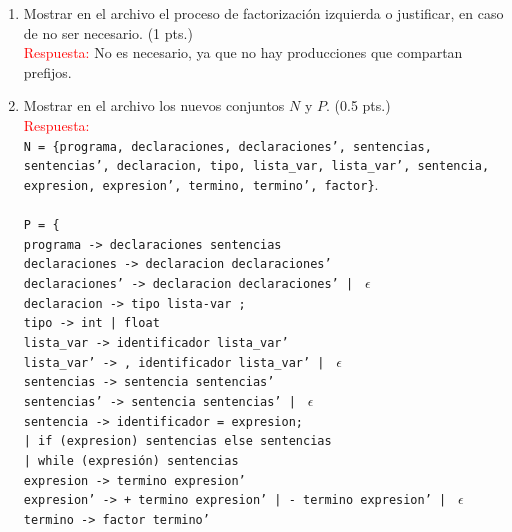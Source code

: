 \documentclass[11pt]{report}
\begin{document}
\begin{enumerate}
\begin{tabular}{ |p{13cm}|l| }
  \texttt{termino' -> * factor termino' |} $\backslash$ \texttt{factor termino' |} $\epsilon$. & $A'$ \texttt{->} $\alpha A'$ $|$ $\epsilon$ \\
  \hline
\end{tabular} \\
\item Mostrar en el archivo el proceso de factorización izquierda o justificar, en caso de
  no ser necesario. (1 pts.) \\
    \textcolor{red}{Respuesta:} No es necesario, ya que no hay producciones que compartan prefijos.
\item Mostrar en el archivo los nuevos conjuntos $N$ y $P$. (0.5 pts.) \\
    \textcolor{red}{Respuesta:} \\
    \texttt{N = \{programa, declaraciones, declaraciones', sentencias,
    sentencias', declaracion, tipo, lista\_var, lista\_var', sentencia, expresion, expresion',
    termino, termino', factor\}}. \\ \\
    \texttt{P = \{} \\
    \texttt{programa -> declaraciones sentencias} \\
    \texttt{declaraciones -> declaracion declaraciones'} \\
    \texttt{declaraciones' -> declaracion declaraciones' | } $\epsilon$ \\
    \texttt{declaracion -> tipo lista-var ;} \\
    \texttt{tipo -> int | float} \\
    \texttt{lista\_var -> identificador lista\_var'} \\
    \texttt{lista\_var' -> , identificador lista\_var' | } $\epsilon$ \\
    \texttt{sentencias -> sentencia sentencias'} \\
    \texttt{sentencias' -> sentencia sentencias' | } $\epsilon$ \\
    \texttt{sentencia -> identificador = expresion;} \\
    \texttt{| if (expresion) sentencias else sentencias} \\
    \texttt{| while (expresión) sentencias} \\
    \texttt{expresion -> termino expresion'} \\
    \texttt{expresion' -> + termino expresion' | - termino expresion' | } $\epsilon$ \\
    \texttt{termino -> factor termino'} \\

\end{enumerate}
\end{document}
